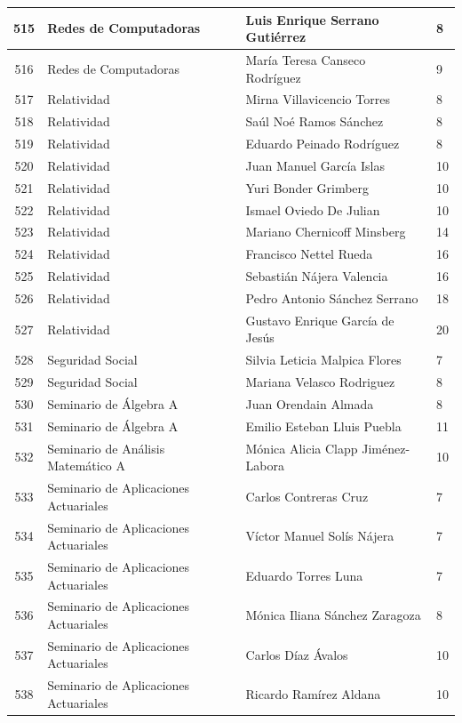 {\begin{longtable}{|c|p{6.5cm}|p{5cm}|p{1.5cm}|}
515 & Redes de Computadoras & Luis Enrique Serrano Gutiérrez & 8 \\ \hline
516 & Redes de Computadoras & María Teresa Canseco Rodríguez & 9 \\ \hline
517 & Relatividad & Mirna Villavicencio Torres & 8 \\ \hline
518 & Relatividad & Saúl Noé Ramos Sánchez & 8 \\ \hline
519 & Relatividad & Eduardo Peinado Rodríguez & 8 \\ \hline
520 & Relatividad & Juan Manuel García Islas & 10 \\ \hline
521 & Relatividad & Yuri Bonder Grimberg & 10 \\ \hline
522 & Relatividad & Ismael Oviedo De Julian & 10 \\ \hline
523 & Relatividad & Mariano Chernicoff Minsberg & 14 \\ \hline
524 & Relatividad & Francisco Nettel Rueda & 16 \\ \hline
525 & Relatividad & Sebastián Nájera Valencia & 16 \\ \hline
526 & Relatividad & Pedro Antonio Sánchez Serrano & 18 \\ \hline
527 & Relatividad & Gustavo Enrique García de Jesús & 20 \\ \hline
528 & Seguridad Social & Silvia Leticia Malpica Flores & 7 \\ \hline
529 & Seguridad Social & Mariana Velasco Rodriguez & 8 \\ \hline
530 & Seminario de Álgebra A & Juan Orendain Almada & 8 \\ \hline
531 & Seminario de Álgebra A & Emilio Esteban Lluis Puebla & 11 \\ \hline
532 & Seminario de Análisis Matemático A & Mónica Alicia Clapp Jiménez-Labora & 10 \\ \hline
533 & Seminario de Aplicaciones Actuariales & Carlos Contreras Cruz & 7 \\ \hline
534 & Seminario de Aplicaciones Actuariales & Víctor Manuel Solís Nájera & 7 \\ \hline
535 & Seminario de Aplicaciones Actuariales & Eduardo Torres Luna & 7 \\ \hline
536 & Seminario de Aplicaciones Actuariales & Mónica Iliana Sánchez Zaragoza & 8 \\ \hline
537 & Seminario de Aplicaciones Actuariales & Carlos Díaz Ávalos & 10 \\ \hline
538 & Seminario de Aplicaciones Actuariales & Ricardo Ramírez Aldana & 10 \\ \hline

\end{longtable}}
